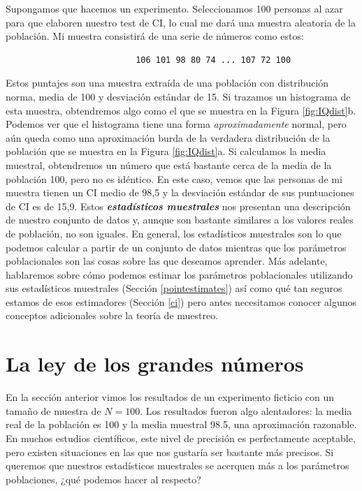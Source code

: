 \documentclass[spanish,]{book}
\begin{document}
Supongamos que hacemos un experimento. Seleccionamos 100 personas al
azar para que elaboren nuestro test de CI, lo cual me dará una muestra
aleatoria de la población. Mi muestra consistirá de una serie de números
como estos:

\begin{verbatim}
                          106 101 98 80 74 ... 107 72 100
\end{verbatim}

Estos puntajes son una muestra extraída de una población con
distribución norma, media de 100 y desviación estándar de 15. Si
trazamos un histograma de esta muestra, obtendremos algo como el que se
muestra en la Figura \ref{fig:IQdist}b. Podemos ver que el histograma
tiene una forma \emph{aproximadamente} normal, pero aún queda como una
aproximación burda de la verdadera distribución de la población que se
muestra en la Figura \ref{fig:IQdist}a. Si calculamos la media muestral,
obtendremos un número que está bastante cerca de la media de la
población 100, pero no es idéntico. En este caso, vemos que las personas
de mi muestra tienen un CI medio de 98,5 y la desviación estándar de sus
puntuaciones de CI es de 15,9. Estos \textbf{\emph{estadísticos
muestrales}} nos presentan una descripción de nuestro conjunto de datos
y, aunque son bastante similares a los valores reales de población, no
son iguales. En general, los estadísticos muestrales son lo que podemos
calcular a partir de un conjunto de datos mientras que los parámetros
poblacionales son las cosas sobre las que deseamos aprender. Más
adelante, hablaremos sobre cómo podemos estimar los parámetros
poblacionales utilizando sus estadísticos muestrales (Sección
\ref{pointestimates}) así como qué tan seguros estamos de esos
estimadores (Sección \ref{ci}) pero antes necesitamos conocer algunos
conceptos adicionales sobre la teoría de muestreo.

\section{La ley de los grandes números}\label{lawlargenumbers}

En la sección anterior vimos los resultados de un experimento ficticio
con un tamaño de muestra de \(N=100\). Los resultados fueron algo
alentadores: la media real de la población es 100 y la media muestral
98.5, una aproximación razonable. En muchos estudios científicos, este
nivel de precisión es perfectamente aceptable, pero existen situaciones
en las que nos gustaría ser bastante más precisos. Si queremos que
nuestros estadísticos muestrales se acerquen más a los parámetros
poblaciones, ¿qué podemos hacer al respecto?
\end{document}
